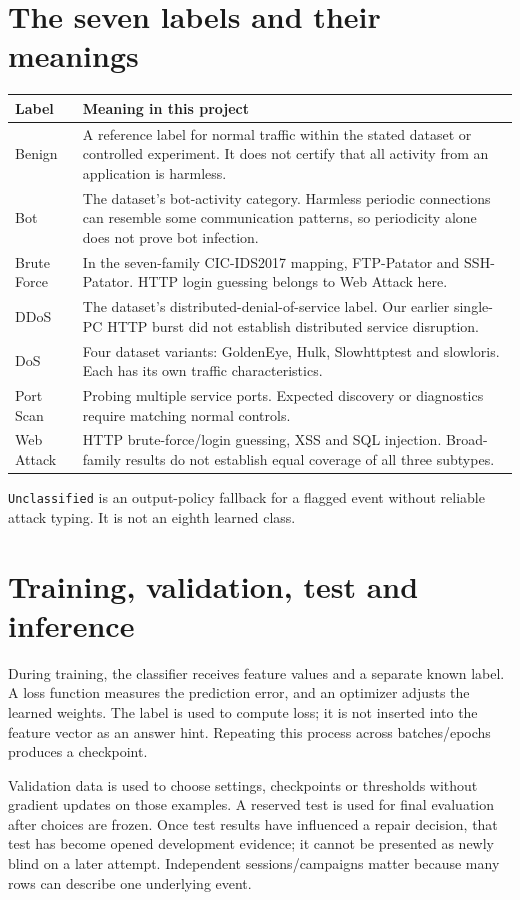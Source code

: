 \documentclass[11pt,a4paper,oneside]{report}
\newcommand{\code}[1]{\nolinkurl{#1}}
\begin{document}
\section{The seven labels and their meanings}
\begin{longtable}{p{}p{}}
\toprule Label & Meaning in this project\\\midrule\endhead
Benign & A reference label for normal traffic within the stated dataset or controlled experiment. It does not certify that all activity from an application is harmless.\\
Bot & The dataset's bot-activity category. Harmless periodic connections can resemble some communication patterns, so periodicity alone does not prove bot infection.\\
Brute Force & In the seven-family CIC-IDS2017 mapping, FTP-Patator and SSH-Patator. HTTP login guessing belongs to Web Attack here.\\
DDoS & The dataset's distributed-denial-of-service label. Our earlier single-PC HTTP burst did not establish distributed service disruption.\\
DoS & Four dataset variants: GoldenEye, Hulk, Slowhttptest and slowloris. Each has its own traffic characteristics.\\
Port Scan & Probing multiple service ports. Expected discovery or diagnostics require matching normal controls.\\
Web Attack & HTTP brute-force/login guessing, XSS and SQL injection. Broad-family results do not establish equal coverage of all three subtypes.\\
\bottomrule
\end{longtable}
\code{Unclassified} is an output-policy fallback for a flagged event without reliable attack typing. It is not an eighth learned class.

\section{Training, validation, test and inference}
During training, the classifier receives feature values and a separate known label. A loss function measures the prediction error, and an optimizer adjusts the learned weights. The label is used to compute loss; it is not inserted into the feature vector as an answer hint. Repeating this process across batches/epochs produces a checkpoint.

Validation data is used to choose settings, checkpoints or thresholds without gradient updates on those examples. A reserved test is used for final evaluation after choices are frozen. Once test results have influenced a repair decision, that test has become opened development evidence; it cannot be presented as newly blind on a later attempt. Independent sessions/campaigns matter because many rows can describe one underlying event.
\end{document}
